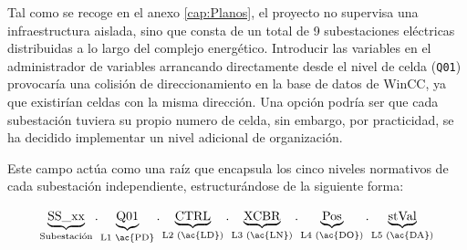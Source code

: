 Tal como se recoge en el anexo \ref{cap:Planos}, el proyecto no supervisa una infraestructura aislada, sino que consta de un total de 9 subestaciones eléctricas distribuidas a lo largo del complejo energético. Introducir las variables en el administrador de variables arrancando directamente desde el nivel  de celda (\texttt{Q01}) provocaría una colisión de direccionamiento en la base de datos de WinCC, ya que existirían celdas con la misma dirección. Una opción podría ser que cada subestación tuviera su propio numero de celda, sin embargo, por practicidad, se ha decidido implementar un nivel adicional de organización.\par

Este campo actúa como una raíz que encapsula los cinco niveles normativos de cada subestación independiente, estructurándose de la siguiente forma:

\begin{equation}
\underbrace{\text{SS\_xx}}_{\text{Subestación}} . \underbrace{\text{Q01}}_{\text{L1 \ac{PD}}} . \underbrace{\text{CTRL}}_{\text{L2 (\ac{LD})}} . \underbrace{\text{XCBR}}_{\text{L3 (\ac{LN})}}.\underbrace{\text{Pos}}_{\text{L4 (\ac{DO})}}.\underbrace{\text{stVal}}_{\text{L5 (\ac{DA})}}
\end{equation}

\begin{table}[tb]
    \centering
    \caption{Ejemplo de direccionamiento en WinCC para los componentes de la subestación.}
    \label{tab:ejemplo_direccionamiento_subestacion}
\end{table}
\FloatBarrier
